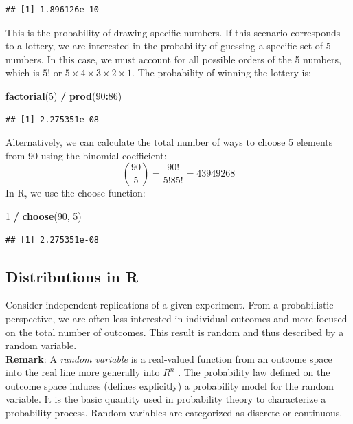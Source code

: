\documentclass[
]{article}
\newenvironment{Shaded}{\begin{snugshade}}{\end{snugshade}}
\newcommand{\DecValTok}[1]{\textcolor[rgb]{0.00,0.00,0.81}{#1}}
\newcommand{\FunctionTok}[1]{\textcolor[rgb]{0.13,0.29,0.53}{\textbf{#1}}}
\newcommand{\NormalTok}[1]{#1}
\newcommand{\SpecialCharTok}[1]{\textcolor[rgb]{0.81,0.36,0.00}{\textbf{#1}}}
\begin{document}
\begin{verbatim}
## [1] 1.896126e-10
\end{verbatim}

This is the probability of drawing specific numbers. If this scenario
corresponds to a lottery, we are interested in the probability of
guessing a specific set of 5 numbers. In this case, we must account for
all possible orders of the 5 numbers, which is \(5!\) or
\(5 \times 4 \times 3 \times 2 \times 1\). The probability of winning
the lottery is:

\begin{Shaded}
\begin{Highlighting}[]
\FunctionTok{factorial}\NormalTok{(}\DecValTok{5}\NormalTok{) }\SpecialCharTok{/} \FunctionTok{prod}\NormalTok{(}\DecValTok{90}\SpecialCharTok{:}\DecValTok{86}\NormalTok{)}
\end{Highlighting}
\end{Shaded}

\begin{verbatim}
## [1] 2.275351e-08
\end{verbatim}

Alternatively, we can calculate the total number of ways to choose 5
elements from 90 using the binomial coefficient:
\[\binom{90}{5} = \frac{90!}{5! 85!} = 43949268\] In R, we use the
choose function:

\begin{Shaded}
\begin{Highlighting}[]
\DecValTok{1} \SpecialCharTok{/} \FunctionTok{choose}\NormalTok{(}\DecValTok{90}\NormalTok{, }\DecValTok{5}\NormalTok{)}
\end{Highlighting}
\end{Shaded}

\begin{verbatim}
## [1] 2.275351e-08
\end{verbatim}

\hypertarget{distributions-in-r}{%
\subsection{Distributions in R}\label{distributions-in-r}}

Consider independent replications of a given experiment. From a
probabilistic perspective, we are often less interested in individual
outcomes and more focused on the total number of outcomes. This result
is random and thus described by a random variable.\\
\textbf{Remark}: A \emph{random variable} is a real-valued function from
an outcome space into the real line more generally into \(R^n\) . The
probability law defined on the outcome space induces (defines
explicitly) a probability model for the random variable. It is the basic
quantity used in probability theory to characterize a probability
process. Random variables are categorized as discrete or continuous.
\end{document}
